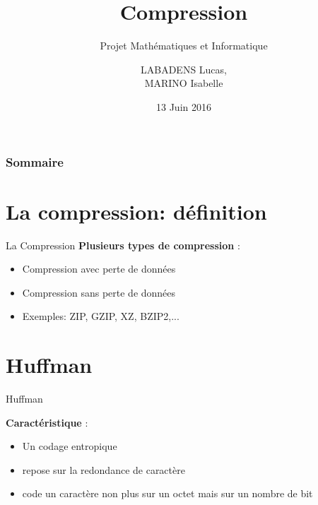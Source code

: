\documentclass[french]{beamer}
\title{Compression}
\subtitle{Projet Mathématiques et Informatique}
\author[]{LABADENS Lucas, \\ MARINO Isabelle}
\date{13 Juin 2016}
\institute[L3 S6-- Informatique]{Université Paris 7 Diderot}
\begin{document}
\begin{frame}
	\titlepage
\end{frame}

\begin{frame}
	\frametitle{Sommaire}
	\tableofcontents	
\end{frame}

\section{La compression: définition }
\begin{frame}{La Compression}
	\textbf{Plusieurs types de compression} :
	\begin{itemize}
	\item<2-4>  Compression avec perte de données
	\item<3-4>  Compression sans perte de données
	\item <4> Exemples: ZIP, GZIP, XZ, BZIP2,...
	\end{itemize}
\end{frame}

\section{Huffman}
\begin{frame}{Huffman}
	\begin{center}
	\textbf{Caractéristique} :\\
	
	\begin{itemize}
	\item  Un codage entropique
	\item  repose sur la redondance de caractère
	\item code un caractère non plus sur un octet mais sur un nombre de bit 
	\end{itemize}
	\end{center}
\end{frame}
\end{document}
